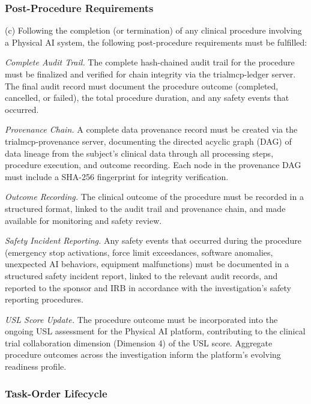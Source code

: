 \subsubsection{Post-Procedure Requirements}

(c) Following the completion (or termination) of any clinical procedure involving a Physical AI system, the following post-procedure requirements must be fulfilled:

\begin{description}[leftmargin=1.0cm,style=sameline]
\item[(1)] \textit{Complete Audit Trail.} The complete hash-chained audit trail for the procedure must be finalized and verified for chain integrity via the trialmcp-ledger server. The final audit record must document the procedure outcome (completed, cancelled, or failed), the total procedure duration, and any safety events that occurred.
\item[(2)] \textit{Provenance Chain.} A complete data provenance record must be created via the trialmcp-provenance server, documenting the directed acyclic graph (DAG) of data lineage from the subject's clinical data through all processing steps, procedure execution, and outcome recording. Each node in the provenance DAG must include a SHA-256 fingerprint for integrity verification.
\item[(3)] \textit{Outcome Recording.} The clinical outcome of the procedure must be recorded in a structured format, linked to the audit trail and provenance chain, and made available for monitoring and safety review.
\item[(4)] \textit{Safety Incident Reporting.} Any safety events that occurred during the procedure (emergency stop activations, force limit exceedances, software anomalies, unexpected AI behaviors, equipment malfunctions) must be documented in a structured safety incident report, linked to the relevant audit records, and reported to the sponsor and IRB in accordance with the investigation's safety reporting procedures.
\item[(5)] \textit{USL Score Update.} The procedure outcome must be incorporated into the ongoing USL assessment for the Physical AI platform, contributing to the clinical trial collaboration dimension (Dimension 4) of the USL score. Aggregate procedure outcomes across the investigation inform the platform's evolving readiness profile.
\end{description}

\subsubsection{Task-Order Lifecycle}

